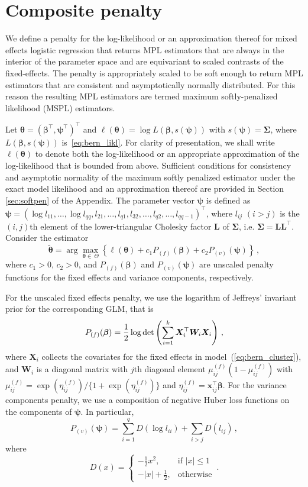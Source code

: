 \documentclass[11pt, a4paper]{article}
\newcommand*{\bb}{\boldsymbol}
\theoremstyle{example} \newtheorem{example}{Example}[section]
\theoremstyle{theorem} \newtheorem{theorem}{Theorem}[section]
\def\det{{\mathop{\rm det}}}
\def\bbeta{\bb{\beta}}
\def\btheta{\bb{\theta}}
\def\bpsi{\bb{\psi}}
\def\bSigma{\bb{\Sigma}}
\def\bx{\bb{x}}
\def\bX{\bb{X}}
\def\bL{\bb{L}}
\def\bW {\bb{W}}
\begin{document}
\section{Composite penalty}\label{sec:composite_penalty}
We define a penalty for the log-likelihood or an approximation thereof 
for mixed effects logistic regression that returns MPL
estimators that are always in the interior of the parameter space and
are equivariant to scaled contrasts of the fixed-effects. The penalty
is appropriately scaled to be soft enough to return MPL
estimators that are consistent and asymptotically normally distributed. For this reason the
resulting MPL estimators are termed maximum
softly-penalized likelihood (MSPL) estimators.

Let $\btheta = (\bbeta^\top, \bpsi^\top)^\top$ and
$\ell(\btheta) = \log L(\bbeta, s(\bpsi))$ with $s(\bpsi) = \bSigma$,
where $L(\bbeta, s(\bpsi))$ is~\eqref{eq:bern_likl}. For clarity of presentation, we shall write $\ell(\btheta)$ to denote both the log-likelihood or an appropriate
approximation of the log-likelihood that is bounded from above. Sufficient conditions for consistency and asymptotic normality of the maximum softly penalized estimator under the exact model likelihood and an approximation thereof are provided in Section \ref{sec:softpen} of the Appendix. The parameter vector $\bpsi$ is defined as
$\bpsi = (\log l_{11}, \ldots, \log l_{qq}, l_{21}, \ldots, l_{q1},
l_{32}, \ldots, l_{q2}, \ldots, l_{qq-1})^\top$, where $l_{ij}$
$(i > j)$ is the $(i,j)$th element of the lower-triangular Cholesky factor $\bL$ of $\bSigma$, i.e.
$\bSigma = \bL\bL^\top$. Consider the estimator
\[
  \tilde{\btheta} = \arg\max_{\btheta \in \ \Theta} \left\{\ell(\btheta) + c_1 P_{(f)}(\bbeta) + c_2 P_{(v)}(\bpsi) \right\}\, ,
\]
where $c_{1} > 0$, $c_{2} > 0$, and $P_{(f)}(\bbeta)$ and
$P_{(v)}(\bpsi)$ are unscaled penalty functions for the fixed effects
and variance components, respectively. 

For the unscaled fixed effects penalty, we use the logarithm of
Jeffreys' invariant prior for the corresponding GLM, that is
\begin{equation}
  \label{eq:jeffreys_pen}
  P_{(f)}(\bbeta) = \frac{1}{2}\log \det\left(\sum_{i = 1}^k \bX^\top_i \bW_i \bX_i\right)\,,
\end{equation}
where $\bX_i$ collects the covariates for the fixed effects in
model~(\ref{eq:bern_cluster}), and $\bW_i$ is a diagonal matrix with
$j$th diagonal element $\mu_{ij}^{(f)} (1 - \mu_{ij}^{(f)})$ with
$\mu_{ij}^{(f)} = \exp(\eta_{ij}^{(f)}) / \{1 +
\exp(\eta_{ij}^{(f)})\}$ and $\eta_{ij}^{(f)} = \bx_{ij}^\top
\bbeta$. For the variance components penalty, we use a composition of
negative Huber loss functions on the components of $\bpsi$. In
particular,
\begin{equation}
  \label{eq:huber_pen}
  P_{(v)}(\bpsi) = \sum_{i = 1}^q D(\log l_{ii}) + \sum_{i > j} D(l_{ij}) \, ,
\end{equation}
where
\[
  D(x) = \begin{cases}
           -\frac{1}{2} x^2, & \text{if } |x|\leq 1 \\ 
           - |x| + \frac{1}{2}, & \text{otherwise}           
         \end{cases} \,.
\]
\end{document}
